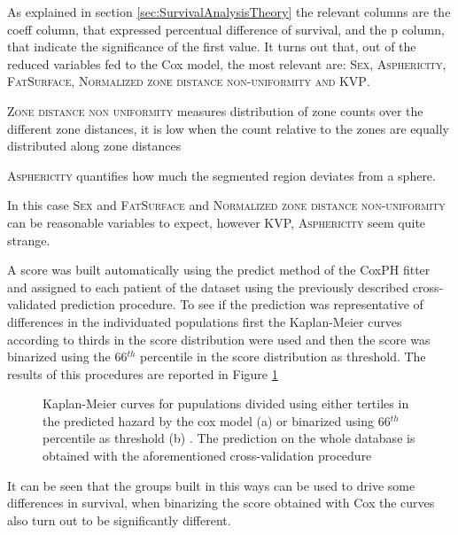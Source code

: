 As explained in section \ref{sec:SurvivalAnalysisTheory} the relevant columns are the coeff column, that expressed percentual difference of survival, and the p column, that indicate the significance of the first value.
It turns out that, out of the reduced variables fed to the Cox model, the most relevant are: {\scshape Sex, Asphericity, FatSurface, Normalized zone distance non-uniformity and KVP}.

{\scshape Zone distance non uniformity} measures distribution of zone counts over the different zone distances, it is low when the count relative to the zones are equally distributed along zone distances

{\scshape Asphericity} quantifies how much the segmented region deviates from a sphere.


In this case {\scshape Sex} and {\scshape FatSurface} and {\scshape Normalized zone distance non-uniformity} can be reasonable variables to expect, however {\scshape KVP, Asphericity} seem quite strange.

A score was built automatically using the predict method of the CoxPH fitter and assigned to each patient of the dataset using the previously described cross-validated prediction procedure.
To see if the prediction was representative of differences in the individuated populations first the Kaplan-Meier curves according to thirds in the score distribution were used and then the score was binarized using the 66$^{th}$ percentile in the score distribution as threshold.
The results of this procedures are reported in Figure \ref{fig:KmCoxScore}

\begin{figure}[H]
\centering
	\newline
        \caption{Kaplan-Meier curves for pupulations divided using either tertiles in the predicted hazard by the cox model (a) or binarized using 66$^{th}$ percentile as threshold (b) . The prediction on the whole database is obtained with the aforementioned cross-validation procedure }\label{fig:KmCoxScore}
\end{figure}

It can be seen that the groups built in this ways can be used to drive some differences in survival, when binarizing the score obtained with Cox the curves also turn out to be significantly different.

